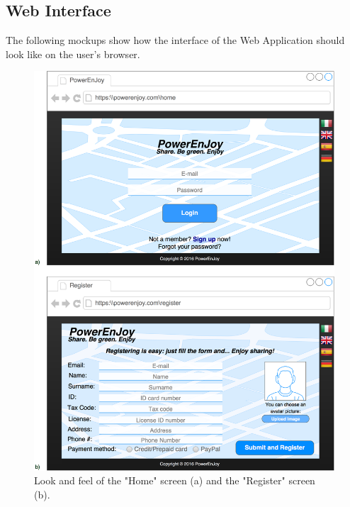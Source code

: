 \subsection{Web Interface}
The following mockups show how the interface of the Web Application should look like on the user's browser.

\begin{figure}[H]
\centering
		\includegraphics[width=\textwidth]{./user_interface_design/diagrams/web_login_register.png}
		\caption{Look and feel of the "Home" screen (a) and the "Register" screen (b).}
		\label{web_login_register}
\end{figure}

